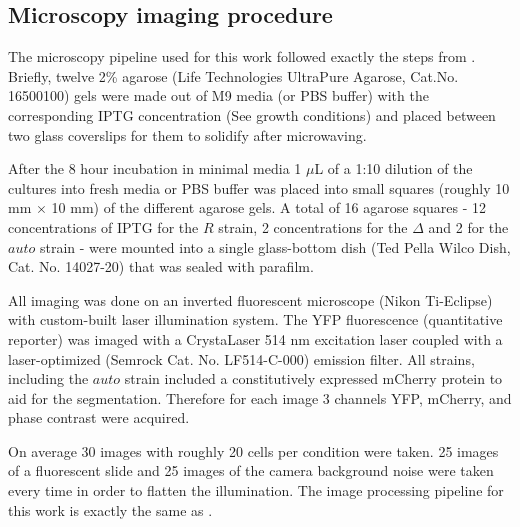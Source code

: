 \subsection{Microscopy imaging procedure}

The microscopy pipeline used for this work followed exactly the steps from
\cite{Razo-Mejia2018}. Briefly, twelve 2\% agarose (Life Technologies UltraPure
Agarose, Cat.No. 16500100) gels were made out of M9 media (or PBS buffer) with
the corresponding IPTG concentration (See growth conditions) and placed between
two glass coverslips for them to solidify after microwaving.

After the 8 hour incubation in minimal media 1 $\mu$L of a 1:10 dilution of the
cultures into fresh media or PBS buffer was placed into small squares (roughly
10 mm $\times$ 10 mm) of the different agarose gels. A total of 16 agarose
squares - 12 concentrations of IPTG for the $R$ strain, 2 concentrations for the
$\Delta$ and 2 for the $auto$ strain - were mounted into a single glass-bottom
dish (Ted Pella Wilco Dish, Cat. No. 14027-20) that was sealed with parafilm.

All imaging was done on an inverted fluorescent microscope (Nikon Ti-Eclipse)
with custom-built laser illumination system. The YFP fluorescence (quantitative
reporter) was imaged with a CrystaLaser 514 nm excitation laser coupled with a
laser-optimized (Semrock Cat. No. LF514-C-000) emission filter. All strains,
including the $auto$ strain included a constitutively expressed mCherry protein
to aid for the segmentation. Therefore for each image 3 channels YFP, mCherry,
and phase contrast were acquired.

On average 30 images with roughly 20 cells per condition were taken. 25 images
of a fluorescent slide and 25 images of the camera background noise were taken
every time in order to flatten the illumination. The image  processing pipeline
for this work is exactly the same as \cite{Razo-Mejia2018}.
